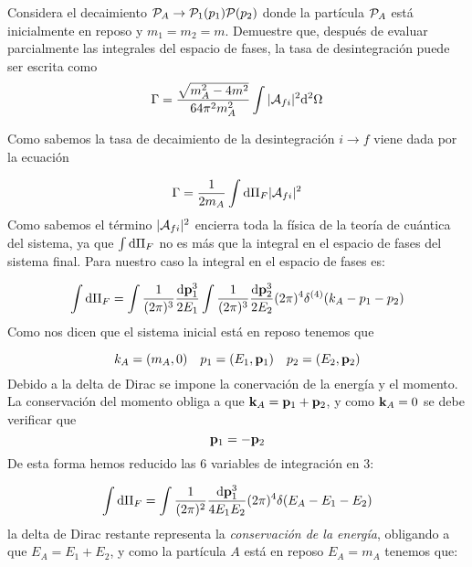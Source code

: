 \begin{ejercicio} 
	Considera el decaimiento $\mathcal{P}_A \rightarrow \mathcal{P}_1 (p_1) \mathcal{P} (p_2)$ donde la partícula $\mathcal{P}_A$ está inicialmente en reposo y $m_1=m_2=m$. Demuestre que, después de evaluar parcialmente las integrales del espacio de fases, la tasa de desintegración puede ser escrita como 
	\begin{equation}
		\Gamma = \frac{\sqrt{m_A^2 - 4 m^2}}{64\pi^2 m_A^2} \int |\mathcal{A}_{fi}|^2 \mathrm{d}^2 \Omega
	\end{equation}
\end{ejercicio}
\begin{solucion} 
	Como sabemos la tasa de decaimiento de la desintegración $i\rightarrow f$ viene dada por la ecuación
	
	\begin{equation*}
		\Gamma = \frac{1}{2m_A} \int \mathrm{d} \Pi_F |\mathcal{A}_{fi}|^2
	\end{equation*}
	Como sabemos el término $|\mathcal{A}_{fi}|^2$ encierra toda la física de la teoría de cuántica del sistema, ya que $\int \mathrm{d} \Pi_F$ no es más que la integral en el espacio de fases del sistema final. Para nuestro caso la integral en el espacio de fases es:
	
	\begin{equation*}
		\int \mathrm{d} \Pi_F = \int \frac{1}{(2\pi)^3} \frac{\mathrm{d} \mathbf{p}_1^3}{2E_1} \int \frac{1}{(2\pi)^3} \frac{\mathrm{d} \mathbf{p}_2^3}{2E_2} (2\pi)^4 \delta^{(4)} (k_A - p_1 - p_2)
	\end{equation*}
	Como nos dicen que el sistema inicial está en reposo tenemos que
	
	\begin{equation*}
		k_A=(m_A,0) \quad p_1 = (E_1,\mathbf{p}_1) \quad p_2 = (E_2,\mathbf{p}_2)
	\end{equation*}
	Debido a la delta de Dirac se impone la conervación de la energía y el momento. La conservación del momento obliga a que $\mathbf{k}_A=\mathbf{p}_1+\mathbf{p}_2$, y como $\mathbf{k}_A=0$ se debe verificar que	
	\begin{equation*}
		\mathbf{p}_1 = - \mathbf{p}_2 
	\end{equation*}
	De esta forma hemos reducido las 6 variables de integración en 3:
	
	\begin{equation*}
		\int \mathrm{d} \Pi_F = \int \frac{1}{(2\pi)^2} \frac{\mathrm{d} \mathbf{p}_1^3}{4E_1E_2} (2\pi)^4 \delta (E_A-E_1-E_2)
	\end{equation*}
	la delta de Dirac restante representa la \textit{conservación de la energía}, obligando a que $E_A=E_1 + E_2$, y como la partícula $A$ está en reposo $E_A=m_A$ tenemos que:
	

\end{solucion}
